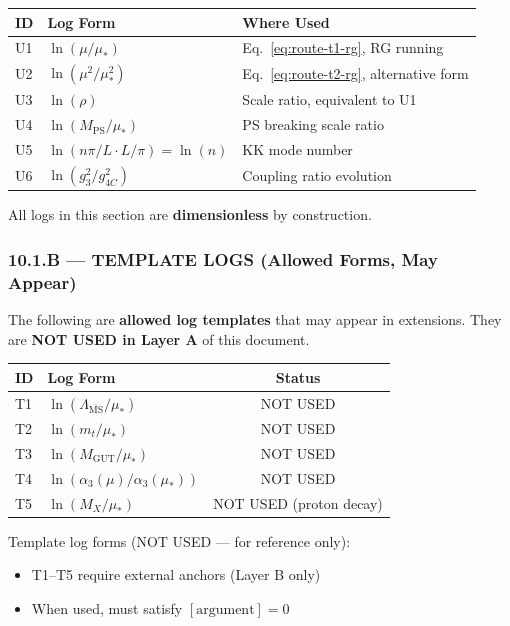 \documentclass[11pt,a4paper]{article}
\theoremstyle{definition}
\begin{document}
\begin{center}
\begin{tabular}{lll}
\toprule
\textbf{ID} & \textbf{Log Form} & \textbf{Where Used} \\
\midrule
U1 & $\ln(\mu/\mu_*)$ & Eq.~\eqref{eq:route-t1-rg}, RG running \\
U2 & $\ln(\mu^2/\mu_*^2)$ & Eq.~\eqref{eq:route-t2-rg}, alternative form \\
U3 & $\ln(\rho)$ & Scale ratio, equivalent to U1 \\
U4 & $\ln(M_{\text{PS}}/\mu_*)$ & PS breaking scale ratio \\
U5 & $\ln(n\pi/L \cdot L/\pi) = \ln(n)$ & KK mode number \\
U6 & $\ln(g_3^2/g_{4C}^2)$ & Coupling ratio evolution \\
\bottomrule
\end{tabular}
\end{center}

All logs in this section are \textbf{dimensionless} by construction.

\subsubsection{10.1.B --- TEMPLATE LOGS (Allowed Forms, May Appear)}
\label{subsubsec:template-logs}

The following are \textbf{allowed log templates} that may appear in extensions.
They are \textbf{NOT USED in Layer A} of this document.

\begin{center}
\begin{tabular}{llc}
\toprule
\textbf{ID} & \textbf{Log Form} & \textbf{Status} \\
\midrule
T1 & $\ln(\Lambda_{\overline{\text{MS}}}/\mu_*)$ & NOT USED \\
T2 & $\ln(m_t/\mu_*)$ & NOT USED \\
T3 & $\ln(M_{\text{GUT}}/\mu_*)$ & NOT USED \\
T4 & $\ln(\alpha_3(\mu)/\alpha_3(\mu_*))$ & NOT USED \\
T5 & $\ln(M_X/\mu_*)$ & NOT USED (proton decay) \\
\bottomrule
\end{tabular}
\end{center}

Template log forms (NOT USED --- for reference only):
\begin{itemize}
  \item T1--T5 require external anchors (Layer B only)
  \item When used, must satisfy $[\text{argument}] = 0$
\end{itemize}
\end{document}
